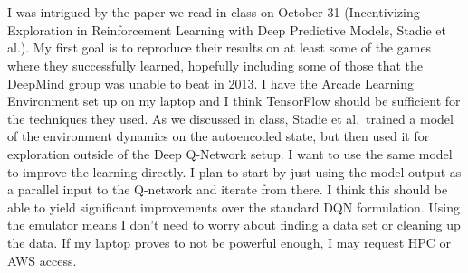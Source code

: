 \documentclass{article}
\begin{document}
\author{Gabriel Ewing}
\noindent \theauthor\\\\
\indent I was intrigued by the paper we read in class on October 31 (Incentivizing Exploration in Reinforcement Learning with Deep Predictive Models, Stadie et al.). My first goal is to reproduce their results on at least some of the games where they successfully learned, hopefully including some of those that the DeepMind group was unable to beat in 2013. I have the Arcade Learning Environment set up on my laptop and I think TensorFlow should be sufficient for the techniques they used.\newline
\indent As we discussed in class, Stadie et al.\ trained a model of the environment dynamics on the autoencoded state, but then used it for exploration outside of the Deep Q-Network setup. I want to use the same model to improve the learning directly. I plan to start by just using the model output as a parallel input to the Q-network and iterate from there. I think this should be able to yield significant improvements over the standard DQN formulation.\newline
\indent Using the emulator means I don't need to worry about finding a data set or cleaning up the data. If my laptop proves to not be powerful enough, I may request HPC or AWS access.\newline
\end{document}
